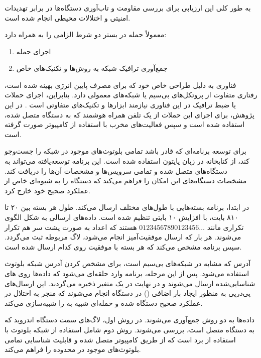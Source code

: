 \subsubsection{}

به طور کلی این ارزیابی برای بررسی مقاومت و تاب‌آوری دستگاه‌ها در برابر تهدیدات
امنیتی و اختلالات محیطی انجام شده است.

معمولاً حمله در بستر  دو شرط الزامی را به همراه دارد:

\begin{enumerate}
    \item اجرای حمله
    \item جمع‌آوری ترافیک شبکه به روش‌ها و تکنیک‌های خاص
\end{enumerate}

فناوری  به دلیل طراحی خاص خود که برای مصرف پایین انرژی بهینه شده است،
رفتاری متفاوت از پروتکل‌های بی‌سیم یا شبکه‌های معمولی دارد. بنابراین، اجرای
حملات یا ضبط ترافیک در این فناوری نیازمند ابزارها و تکنیک‌های متفاوتی است
\cite{matHackingTheBLE}. در این پژوهش، برای اجرای این حملات از یک تلفن همراه
هوشمند که به دستگاه  متصل شده، استفاده شده است و سپس فعالیت‌های مخرب با
استفاده از کامپیوتر صورت گرفته است.

برای توسعه برنامه‌ای که قادر باشد تمامی بلوتوث‌های موجود در شبکه را جست‌وجو کند،
از کتابخانه  در زبان پایتون استفاده شده است. این برنامه توسعه‌یافته
می‌تواند به دستگاه‌های  متصل شده و تمامی سرویس‌ها و مشخصات آن‌ها را
دریافت کند. مشخصات دستگاه‌های  این امکان را فراهم می‌کند که دستگاه را
به شیوه‌ای خاص از عملکرد صحیح خود خارج کرد.

در ابتدا، برنامه بسته‌هایی با طول‌های مختلف ارسال می‌کند. طول هر بسته بین ۲۰ تا
۸۱۰ بایت، با افزایش ۱۰ بایتی تنظیم شده است. داده‌های ارسالی به شکل الگوی تکراری
مانند $01234567890123456\ldots$ هستند که اعداد به صورت پشت سر هم تکرار می‌شوند.
هر بار که ارسال موفقیت‌آمیز انجام می‌شود، لاگ مربوطه ثبت می‌گردد. سپس برنامه
مشخص می‌کند که هر بسته با موفقیت روی کدام  ارسال شده است.

آدرس  که مشابه  در شبکه‌های بی‌سیم  است، برای مشخص
کردن آدرس شبکه بلوتوث استفاده می‌شود. پس از این مرحله، برنامه وارد حلقه‌ای
می‌شود که داده‌ها روی های شناسایی‌شده ارسال می‌شوند و در نهایت در یک
متغیر ذخیره می‌گردند. این ارسال‌های پی‌درپی به منظور ایجاد بار اضافی
() در دستگاه انجام می‌شوند که منجر به اختلال در عملکرد صحیح دستگاه
شده و حمله‌ای شبیه به  را شبیه‌سازی می‌کند.

داده‌ها به دو روش جمع‌آوری می‌شوند. در روش اول، لاگ‌های سمت دستگاه اندروید که به
دستگاه  متصل است، بررسی می‌شوند. روش دوم شامل استفاده از  شبکه
بلوتوث با استفاده از برد  است که از طریق کامپیوتر متصل شده و
قابلیت شناسایی تمامی بلوتوث‌های موجود در محدوده را فراهم می‌کند.

